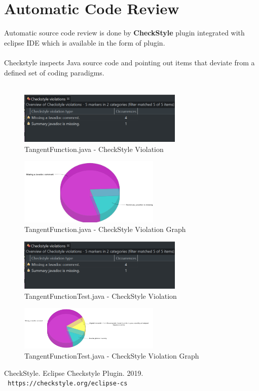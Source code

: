 \documentclass[letterpaper, 11pt]{report}
\begin{document}
\section*{Automatic Code Review}
Automatic source code review is done by  \textbf{CheckStyle}\cite{CheckStyle} plugin integrated with eclipse IDE which is available in the form of plugin.\\\\
Checkstyle inspects Java source code and pointing out items that deviate from a deﬁned set of
coding paradigms.\\\\
\begin{figure}[htb]
\includegraphics[width=0.7\textwidth]{F2_Code_Review_CheckStyle_Violation}
\centering
\caption{TangentFunction.java - CheckStyle Violation}
\end{figure}
\begin{figure}[htb]
\includegraphics[width=0.6\textwidth]{F2_Code_Review_CheckStyle_Violation_Graph}
\centering
\caption{TangentFunction.java - CheckStyle Violation Graph}
\end{figure}
\begin{figure}[htb]
\includegraphics[width=0.7\textwidth]{F2_Code_Review_CheckStyle_Violation}
\centering
\caption{TangentFunctionTest.java - CheckStyle Violation }
\end{figure}
\begin{figure}[htb]
\includegraphics[width=0.6\textwidth]{F2_Code_Review_CheckStyle_Violation_Graph_TestCases}
\centering
\caption{TangentFunctionTest.java - CheckStyle Violation Graph}
\end{figure}

\begin{thebibliography}{}
 CheckStyle. Eclipse Checkstyle Plugin. 2019.
\\\texttt{ https://checkstyle.org/eclipse-cs}
\end{thebibliography}
\end{document}
